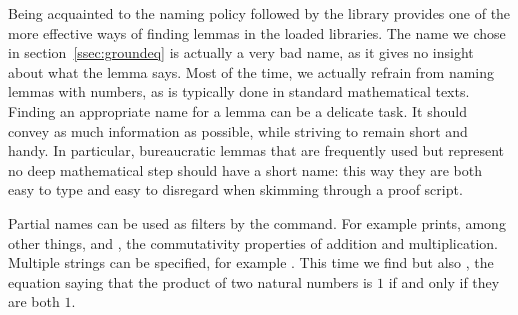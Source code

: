 Being acquainted to the naming policy followed by the \mcbMC{} library
provides one of the more effective ways of finding lemmas in the
loaded libraries. The name   we chose in
section~\ref{ssec:groundeq} is actually a very bad name, as it gives no
insight about what the lemma says. Most of the time, we actually
refrain  from naming lemmas with numbers, as is typically done in
standard mathematical texts. Finding an appropriate name for a
lemma can be a delicate task. It should convey as much information as
possible, while striving to remain short and handy. In particular,
bureaucratic lemmas that are frequently used but represent no deep
mathematical step should have a short name: this way they are both
easy to type and easy to disregard when skimming through a proof
script.

Partial names can be used as filters by the  command. For example
 prints, among other things,  and ,
the commutativity properties of addition and multiplication.  Multiple
strings can be specified, for example .  This time
we find  but also , the equation saying that
the product of two natural numbers is $1$ if and only if they are both $1$.


